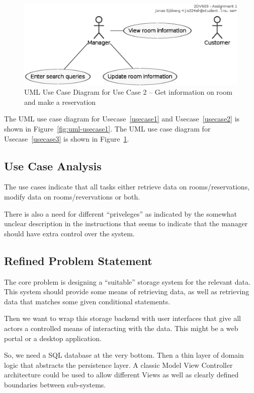 \begin{figure}[htbp]
  \centering
  \includegraphics[width=0.8\linewidth]{include/usecase2.eps}
  \caption{UML Use Case Diagram for Use Case 2 -- Get information on room and make a reservation}
  \label{fig:uml-usecase2}
\end{figure}


The UML use case diagram for Usecase~\ref{usecase1} and Usecase~\ref{usecase2} is shown in Figure~\ref{fig:uml-usecase1}.
The UML use case diagram for Usecase~\ref{usecase3} is shown in Figure~\ref{fig:uml-usecase2}.


\subsection{Use Case Analysis}
%
%
The use cases indicate that all tasks either retrieve data on
rooms/reservations, modify data on rooms/revervations or both.

There is also a need for different ``priveleges'' as indicated by the somewhat
unclear description in the instructions that seems to indicate that the manager
should have extra control over the system.



\subsection{Refined Problem Statement}
%
%
The core problem is designing a ``suitable'' storage system for the relevant
data. This system should provide some means of retrieving data, as well as
retrieving data that matches some given conditional statements.

Then we want to wrap this storage backend with user interfaces that give all
actors a controlled means of interacting with the data.
This might be a web portal or a desktop application.


So, we need a SQL database at the very bottom. Then a thin layer of domain
logic that abstracts the persistence layer. A classic Model View Controller
architecture could be used to allow different Views as well as clearly defined
boundaries between sub-systems.

